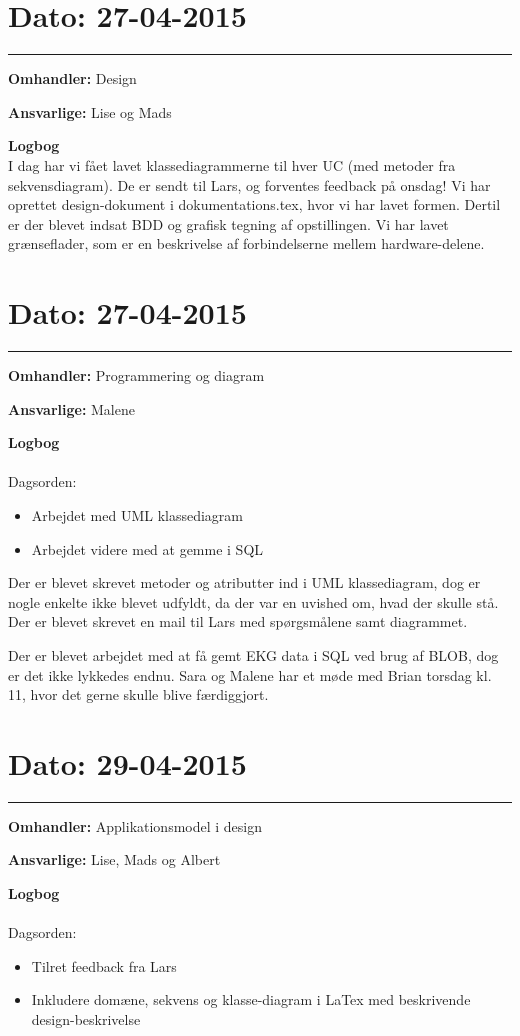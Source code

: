 \section{Dato: 27-04-2015}
\hrule

\textbf{Omhandler:} Design

\textbf{Ansvarlige:} Lise og Mads

\textbf{Logbog}
\\
I dag har vi fået lavet klassediagrammerne til hver UC (med metoder fra sekvensdiagram). De er sendt til Lars, og forventes feedback på onsdag! 
Vi har oprettet design-dokument i dokumentations.tex, hvor vi har lavet formen. Dertil er der blevet indsat BDD og grafisk tegning af opstillingen. 
Vi har lavet grænseflader, som er en beskrivelse af forbindelserne mellem hardware-delene. 

\section{Dato: 27-04-2015}
\hrule


\textbf{Omhandler:} Programmering og diagram

\textbf{Ansvarlige:} Malene

\textbf{Logbog}
\\
\\
Dagsorden:
\begin{itemize}
	\item Arbejdet med UML klassediagram
	\item Arbejdet videre med at gemme i SQL
\end{itemize}


Der er blevet skrevet metoder og atributter ind i UML klassediagram, dog er nogle enkelte ikke blevet udfyldt, da der var en uvished om, hvad der skulle stå. Der er blevet skrevet en mail til Lars med spørgsmålene samt diagrammet.

Der er blevet arbejdet med at få gemt EKG data i SQL ved brug af BLOB, dog er det ikke lykkedes endnu. Sara og Malene har et møde med Brian torsdag kl. 11, hvor det gerne skulle blive færdiggjort.


\section{Dato: 29-04-2015}
\hrule

\textbf{Omhandler:} Applikationsmodel i design

\textbf{Ansvarlige:} Lise, Mads og Albert

\textbf{Logbog}
\\
\\
Dagsorden:
\begin{itemize}
	\item Tilret feedback fra Lars
	\item Inkludere domæne, sekvens og klasse-diagram i LaTex med beskrivende design-beskrivelse
\end{itemize}

